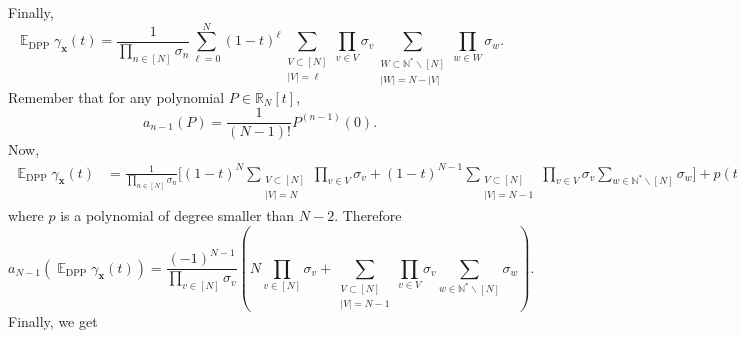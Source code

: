\documentclass[twoside,11pt]{book}
\numberwithin{theorem}{chapter}
\numberwithin{definition}{chapter}
\numberwithin{proposition}{chapter}
\numberwithin{corollary}{chapter}
\numberwithin{example}{chapter}
\numberwithin{lemma}{chapter}
\numberwithin{assumption}{chapter}
\numberwithin{equation}{chapter}
\numberwithin{figure}{chapter}
\DeclareMathOperator{\DPP}{\mathrm{DPP}}
\DeclareMathOperator{\EX}{\mathbb{E}}
\begin{document}
Finally,
\begin{equation}
\EX_{\DPP} \gamma_{\bm{x}}(t) = \frac{1}{\prod\limits_{n \in [N]}\sigma_n} \sum\limits_{\ell =0}^{N} (1-t)^{\ell} \sum\limits_{\substack{V \subset [N]\\|V| = \ell}} \prod\limits_{v \in V}\sigma_{v}  \sum\limits_{\substack{W \subset \mathbb{N}^{*} \smallsetminus[N]\\  |W|= N-|V|}}  \prod\limits_{w \in W}\sigma_{w}.
\end{equation}
Remember that for any polynomial $P \in \mathbb{R}_{N}[t]$, 
\begin{equation}
a_{n-1}(P) = \frac{1}{(N-1)!}P^{(n-1)}(0).
\end{equation}
Now,
\begin{align}
\EX_{\DPP} \gamma_{\bm{x}}(t) & = \frac{1}{\prod\limits_{n \in [N]}\sigma_n} \Big[ (1-t)^{N} \sum\limits_{\substack{V \subset [N]\\|V| = N}} \prod\limits_{v \in V}\sigma_{v}  + (1-t)^{N-1} \sum\limits_{\substack{V \subset [N]\\|V| = N-1}} \prod\limits_{v \in V}\sigma_{v}  \sum\limits_{w \in \mathbb{N}^{*} \smallsetminus [N]} \sigma_{w} \Big] +p(t),
\end{align}
where $p$ is a polynomial of degree smaller than $N-2$.
Therefore
\begin{equation}
a_{N-1}(\EX_{\DPP} \gamma_{\bm{x}}(t)) = \frac{(-1)^{N-1}}{\prod\limits_{v \in [N]}\sigma_{v}} \left( N\prod\limits_{v \in [N]}\sigma_{v} + \sum\limits_{\substack{V \subset [N]\\ |V| = N-1}} \prod\limits_{v \in V}\sigma_{v} \sum\limits_{w \in \mathbb{N}^{*}\smallsetminus [N]} \sigma_{w} \right).
\end{equation}
Finally, we get

\end{document}
